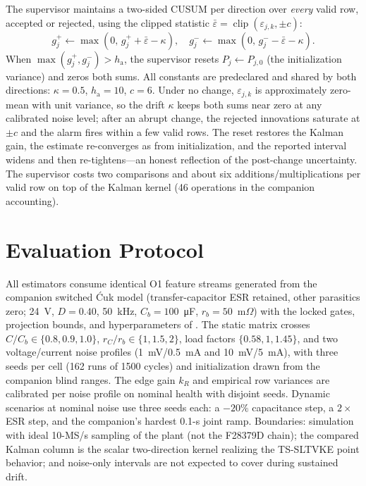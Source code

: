 \documentclass[journal]{IEEEtran}
\newcommand{\Cuk}{\'{C}uk}
\newcommand{\TSKF}{TS-SLTVKE}
\begin{document}
The supervisor maintains a two-sided CUSUM per direction over
\emph{every} valid row, accepted or rejected, using the clipped statistic
$\bar\varepsilon=\operatorname{clip}(\varepsilon_{j,k},\pm c)$:
\begin{equation}
g_j^+\!\leftarrow\!\max(0,\,g_j^+\!+\bar\varepsilon-\kappa),\quad
g_j^-\!\leftarrow\!\max(0,\,g_j^-\!-\bar\varepsilon-\kappa).
\label{eq:cusum}
\end{equation}
When $\max(g_j^+,g_j^-)>h_{\mathrm{a}}$, the supervisor resets
$P_j\leftarrow P_{j,0}$ (the initialization variance) and zeros both
sums. All constants are predeclared and shared by both directions:
$\kappa=0.5$, $h_{\mathrm{a}}=10$, $c=6$. Under no change,
$\varepsilon_{j,k}$ is approximately zero-mean with unit variance, so the
drift $\kappa$ keeps both sums near zero at any calibrated noise level;
after an abrupt change, the rejected innovations saturate at $\pm c$ and
the alarm fires within a few valid rows. The reset restores the Kalman
gain, the estimate re-converges as from initialization, and the reported
interval widens and then re-tightens---an honest reflection of the
post-change uncertainty. The supervisor costs two comparisons and about
six additions/multiplications per valid row on top of the Kalman kernel
(46 operations in the companion accounting).

\section{Evaluation Protocol}
All estimators consume identical O1 feature streams generated from the
companion switched \Cuk{} model (transfer-capacitor ESR retained, other
parasitics zero; 24~V, $D=0.40$, 50~kHz, $C_b=100$~\si{\micro\farad},
$r_b=50$~m$\Omega$) with the locked gates, projection bounds, and
hyperparameters of \cite{companion2026}. The static matrix crosses
$C/C_b\in\{0.8,0.9,1.0\}$, $r_C/r_b\in\{1,1.5,2\}$, load factors
$\{0.58,1,1.45\}$, and two voltage/current noise profiles
(1~mV/0.5~mA and 10~mV/5~mA), with three seeds per cell (162 runs of
1500 cycles) and initialization drawn from the companion blind ranges. The edge gain $k_R$ and empirical row variances
are calibrated per noise profile on nominal health with disjoint seeds.
Dynamic scenarios at nominal noise use three seeds each: a $-20\%$
capacitance step, a $2\times$ ESR step, and the companion's hardest
0.1-s joint ramp. Boundaries: simulation with ideal 10-MS/s sampling of
the plant (not the F28379D chain); the compared Kalman column is the
scalar two-direction kernel realizing the \TSKF{} point behavior; and
noise-only intervals are not expected to cover during sustained drift.
\end{document}
